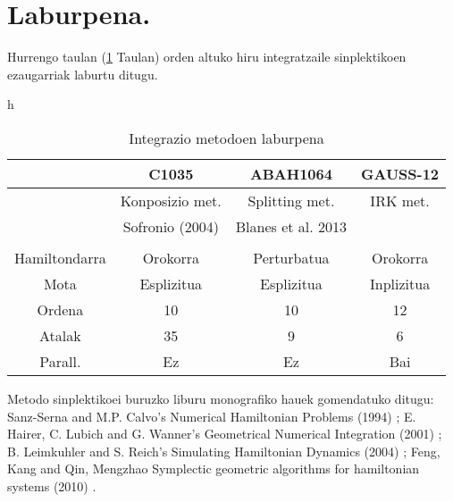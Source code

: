 \section{Laburpena.}

Hurrengo taulan (\ref{tab:int_sinp} Taulan) orden altuko hiru integratzaile sinplektikoen ezaugarriak laburtu ditugu. 

\begin{table}{h}
\centering
\caption{Integrazio metodoen laburpena}
\label{tab:int_sinp}       %
\begin{tabular}{ c|c c c } 
           &  C1035             &  ABAH1064           & GAUSS-12           \\
 \hline
 	       & Konposizio met.    & Splitting met.     & IRK met.            \\
 	       & Sofronio (2004)    & Blanes et al. 2013 &                     \\
 \hline 
               &                    &                    &                 \\
 Hamiltondarra & Orokorra           & Perturbatua        & Orokorra        \\ 	    
 Mota          & Esplizitua         & Esplizitua         & Inplizitua      \\ 
 Ordena        & 10                 & 10                 & 12              \\ 
 Atalak        & 35                 & 9                  & 6               \\ 
 Parall.       & Ez                 & Ez                 & Bai             \\  
\end{tabular}
\end{table}
 
 Metodo sinplektikoei buruzko liburu monografiko hauek gomendatuko ditugu: Sanz-Serna and M.P. Calvo’s Numerical Hamiltonian Problems (1994) \cite{JMSanz-Serna1994}; E. Hairer, C. Lubich and G. Wanner’s Geometrical Numerical Integration (2001) \cite{Hairer2006}; B. Leimkuhler and S. Reich’s Simulating Hamiltonian Dynamics (2004) \cite{Leimkuhler2004}; Feng, Kang and Qin, Mengzhao  Symplectic geometric algorithms for hamiltonian systems (2010) \cite{Feng2010}.
